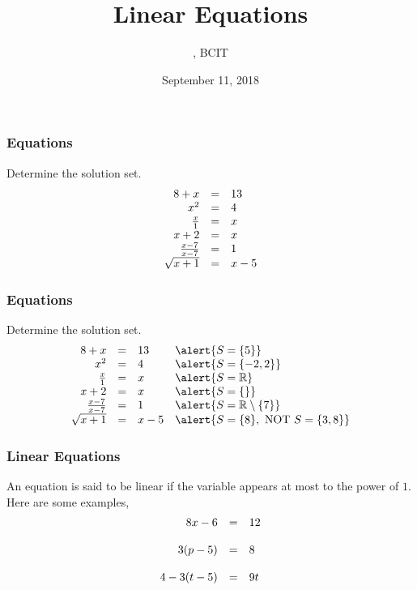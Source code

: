 \documentclass[xcolor=dvipsnames]{beamer}
\title{Linear Equations}
\subtitle{{\CourseNumber}, BCIT}
\author{\CourseName}
\date{September 11, 2018}
\begin{document}
\begin{frame}
  \titlepage
\end{frame}

\begin{frame}
  \frametitle{Equations}
  {\ubung} Determine the solution set.
\begin{equation}
  \label{eq:b2}
  \begin{array}{rcl}
    8+x&=&13 \\ 
    x^{2}&=&4 \\ 
    \frac{x}{1}&=&x \\ 
    x+2&=&x \\ 
    \frac{x-7}{x-7}&=&1 \\ 
    \sqrt{x+1}&=&x-5 \\ 
  \end{array}\notag
\end{equation}
\end{frame}

\begin{frame}
  \frametitle{Equations}
  \addtocounter{exercise}{-1}
  {\ubung} Determine the solution set.
\begin{equation}
  \label{eq:b2a}
  \begin{array}{rcll}
    8+x&=&13&\alert{S=\{5\}} \\ 
    x^{2}&=&4&\alert{S=\{-2,2\}} \\ 
    \frac{x}{1}&=&x&\alert{S=\mathbb{R}} \\ 
    x+2&=&x&\alert{S=\{\}} \\ 
    \frac{x-7}{x-7}&=&1&\alert{S=\mathbb{R}\setminus\{7\}} \\ 
    \sqrt{x+1}&=&x-5&\alert{S=\{8\},\mbox{ NOT }S=\{3,8\}} \\ 
  \end{array}\notag
\end{equation}
\end{frame}

\begin{frame}
  \frametitle{Linear Equations}
An equation is said to be linear if the variable appears at most to the
power of $1$. Here are some examples,
\begin{equation}
  \label{eq:oothahlo}
  \begin{array}{rcl}
8x-6&=&12 \\
\hspace{.5in} && \\
3(p-5)&=&8 \\
\hspace{.5in} && \\
4-3(t-5)&=&9t
  \end{array}
\end{equation}
\end{frame}
\end{document}
